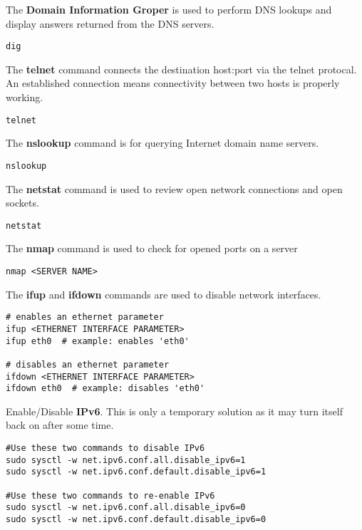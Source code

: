 The \textbf{Domain Information Groper} is used to perform DNS lookups and display answers returned from the DNS servers.
\begin{lstlisting}
dig
\end{lstlisting}

The \textbf{telnet} command connects the destination host:port via the telnet protocal. An established connection means connectivity between two hosts is properly working.
\begin{lstlisting}
telnet
\end{lstlisting}

The \textbf{nslookup} command is for querying Internet domain name servers.
\begin{lstlisting}
nslookup
\end{lstlisting}

The \textbf{netstat} command is used to review open network connections and open sockets. 
\begin{lstlisting}
netstat
\end{lstlisting}

The \textbf{nmap} command is used to check for opened ports on a server
\begin{lstlisting}
nmap <SERVER NAME>
\end{lstlisting}

The \textbf{ifup} and \textbf{ifdown} commands are used to disable network interfaces.
\begin{lstlisting}
# enables an ethernet parameter
ifup <ETHERNET INTERFACE PARAMETER>
ifup eth0  # example: enables 'eth0'

# disables an ethernet parameter
ifdown <ETHERNET INTERFACE PARAMETER>
ifdown eth0  # example: disables 'eth0'
\end{lstlisting}

Enable/Disable \textbf{IPv6}. This is only a temporary solution as it may turn itself back on after some time.
\begin{lstlisting}
#Use these two commands to disable IPv6
sudo sysctl -w net.ipv6.conf.all.disable_ipv6=1
sudo sysctl -w net.ipv6.conf.default.disable_ipv6=1

#Use these two commands to re-enable IPv6
sudo sysctl -w net.ipv6.conf.all.disable_ipv6=0
sudo sysctl -w net.ipv6.conf.default.disable_ipv6=0
\end{lstlisting}






